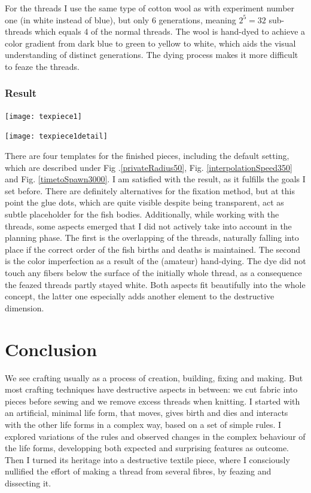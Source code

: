 \documentclass{scrartcl}
\begin{document}
For the threads I use the same type of cotton wool as with experiment number one (in white instead of blue), but only 6 generations, meaning $2^5 = 32$ sub-threads which equals 4 of the normal threads. The wool is hand-dyed to achieve a color gradient from dark blue to green to yellow to white, which aids the visual understanding of distinct generations. The dying process makes it more difficult to feaze the threads.

\subsubsection{Result}

\begin{minipage}[t]{0.46\textwidth}
\texttt{[image: texpiece1]}
\end{minipage}
\hspace{0.5cm}
\begin{minipage}[t]{0.46\textwidth}
\texttt{[image: texpiece1detail]}
\end{minipage}
\vspace{0.5cm}

There are four templates for the finished pieces, including the default setting, which are described under Fig .\ref{privateRadius50}, Fig. \ref{interpolationSpeed350} and Fig. \ref{timetoSpawn3000}.
I am satisfied with the result, as it fulfills the goals I set before.
There are definitely alternatives for the fixation method, but at this point the glue dots, which are quite visible despite being transparent, act as subtle placeholder for the fish bodies.
Additionally, while working with the threads, some aspects emerged that I did not actively take into account in the planning phase. 
The first is the overlapping of the threads, naturally falling into place if the correct order of the fish births and deaths is maintained.
The second is the color imperfection as a result of the (amateur) hand-dying. The dye did not touch any fibers below the surface of the initially whole thread, as a consequence the feazed threads partly stayed white.
Both aspects fit beautifully into the whole concept, the latter one especially adds another element to the destructive dimension.

\section{Conclusion}

We see crafting usually as a process of creation, building, fixing and making. But most crafting techniques have destructive aspects in between: we cut fabric into pieces before sewing and we remove excess threads when knitting.
I started with an artificial, minimal life form, that moves, gives birth and dies and interacts with the other life forms in a complex way, based on a set of simple rules. I explored variations of the rules and observed changes in the complex behaviour of the life forms, developping both expected and surprising features as outcome.
Then I turned its heritage into a destructive textile piece, where I consciously nullified the effort of making a thread from several fibres, by feazing and dissecting it.
\end{document}
